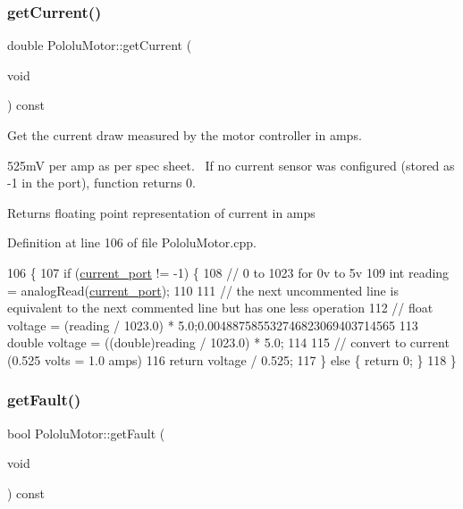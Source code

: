 \subsubsection{\texorpdfstring{get\+Current()}{getCurrent()}}
{\footnotesize\ttfamily double Pololu\+Motor\+::get\+Current (\begin{DoxyParamCaption}\item[{void}]{ }\end{DoxyParamCaption}) const}



Get the current draw measured by the motor controller in amps. 

525mV per amp as per spec sheet.~\newline
 If no current sensor was configured (stored as -\/1 in the port), function returns 0. \begin{DoxyReturn}{Returns}
floating point representation of current in amps 
\end{DoxyReturn}


Definition at line 106 of file Pololu\+Motor.\+cpp.


\begin{DoxyCode}
106                                          \{
107     \textcolor{keywordflow}{if} (\hyperlink{class_pololu_motor_a6b58fc42cb55c835b966f20092aee79b}{current\_port} != -1) \{
108         \textcolor{comment}{// 0 to 1023 for 0v to 5v}
109         \textcolor{keywordtype}{int} reading = analogRead(\hyperlink{class_pololu_motor_a6b58fc42cb55c835b966f20092aee79b}{current\_port});
110         
111         \textcolor{comment}{// the next uncommented line is equivalent to the next commented line but has one less operation}
112         \textcolor{comment}{// float voltage = (reading / 1023.0) * 5.0;0.004887585532746823069403714565}
113         \textcolor{keywordtype}{double} voltage = ((double)reading / 1023.0) * 5.0;
114 
115         \textcolor{comment}{// convert to current (0.525 volts = 1.0 amps)}
116         \textcolor{keywordflow}{return} voltage / 0.525;
117     \} \textcolor{keywordflow}{else} \{ \textcolor{keywordflow}{return} 0; \}
118 \}
\end{DoxyCode}
\mbox{\label{class_pololu_motor_a677969e5e4b72a502508e9a152059064}} 
\subsubsection{\texorpdfstring{get\+Fault()}{getFault()}}
{\footnotesize\ttfamily bool Pololu\+Motor\+::get\+Fault (\begin{DoxyParamCaption}\item[{void}]{ }\end{DoxyParamCaption}) const}



